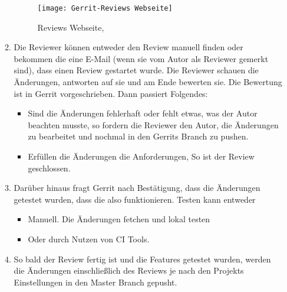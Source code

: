 \begin{itemize}
\begin{enumerate}
			\begin{figure}[H]
				\centering
				\texttt{[image: Gerrit-Reviews Webseite]}
				\caption[Gerrit: Reviews Webseite]{Reviews Webseite,\\ \cite{Gerrit}}
				\label{fig:Gerrit-Reviews Webseite}
			\end{figure}
			
			\item Die Reviewer können entweder den Review manuell finden oder bekommen die eine E-Mail (wenn sie vom Autor als Reviewer gemerkt sind), dass einen Review
				 gestartet wurde. Die Reviewer schauen die Änderungen, antworten auf sie und am Ende bewerten sie. Die Bewertung ist in Gerrit vorgeschrieben.
				 Dann passiert Folgendes:
				 \begin{itemize}
				 	\item Sind die Änderungen fehlerhaft oder fehlt etwas, was der Autor beachten musste, so fordern die Reviewer den Autor, die Änderungen zu bearbeitet
				 		und nochmal in den Gerrits Branch zu pushen.
				 	\item Erfüllen die Änderungen die Anforderungen, So ist der Review geschlossen.
				 \end{itemize}
			\item Darüber hinaus fragt Gerrit nach Bestätigung, dass die Änderungen getestet wurden, dass die also funktionieren. Testen kann entweder 
			\begin{itemize}
				\item Manuell. Die Änderungen fetchen und lokal testen
				\item Oder durch Nutzen von \ac{CI} Tools.
			\end{itemize}
			\item So bald der Review fertig ist und die Features getestet wurden, werden die Änderungen einschließlich des Reviews je nach den Projekts Einstellungen in
				den Master Branch gepusht.
		\end{enumerate}
		
\end{itemize}


